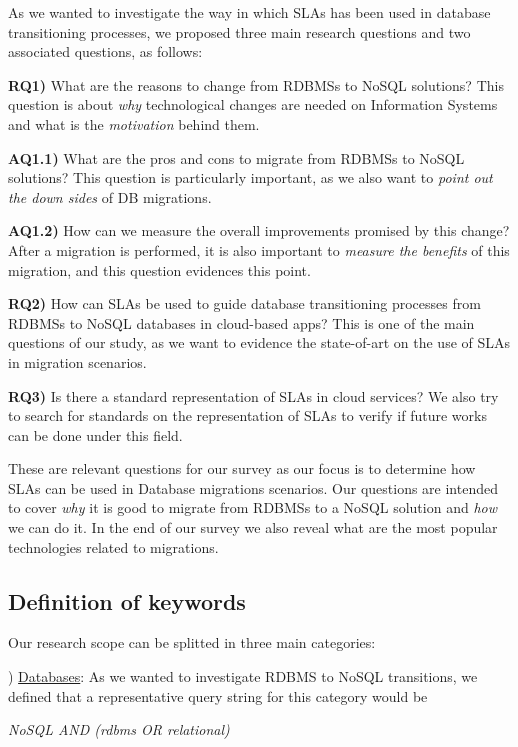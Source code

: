 \documentclass[conference, 10pt, a4paper]{IEEEtran}
\begin{document}
As we wanted to investigate the way in which SLAs has been used in database transitioning processes, we proposed three main research questions and two associated questions, as follows:

\noindent\textbf{RQ1)} What are the reasons to change from RDBMSs to NoSQL solutions? This question is about \textit{why} technological changes are needed on Information Systems and what is the \textit{motivation} behind them. 

\textbf{AQ1.1)} What are the pros and cons to migrate from RDBMSs to NoSQL solutions? This question is particularly important, as we also want to \textit{point out the down sides} of DB migrations.
 
\textbf{AQ1.2)} How can we measure the overall improvements promised by this change? After a migration is performed, it is also important to \textit{measure the benefits} of this migration, and this question evidences this point. 

\noindent\textbf{RQ2)} How can SLAs be used to guide database transitioning processes from RDBMSs to NoSQL databases in cloud-based apps? This is one of the main questions of our study, as we want to evidence the state-of-art on the use of SLAs in migration scenarios. 

\noindent\textbf{RQ3)} Is there a standard representation of SLAs in cloud services? We also try to search for standards on the representation of SLAs to verify if future works can be done under this field.

\bigskip

These are relevant questions for our survey as our focus is to determine how SLAs can be used in Database migrations scenarios. 
Our questions are intended to cover \textit{why} it is good to migrate from RDBMSs to a NoSQL solution and \textit{how} we can do it. In the end of our survey we also reveal what are the most popular technologies related to migrations.

\subsection{Definition of keywords}
\label{sec:sok}

Our research scope can be splitted in three main categories: 

) \underline{Databases}: As we wanted to investigate RDBMS to NoSQL transitions, we defined that a representative query string for this category would be 

\begin{center}
\textit{NoSQL AND (rdbms OR relational)}
\end{center}
\end{document}
